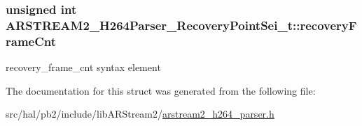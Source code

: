 \subsubsection[{\texorpdfstring{recovery\+Frame\+Cnt}{recoveryFrameCnt}}]{\setlength{\rightskip}{0pt plus 5cm}unsigned int A\+R\+S\+T\+R\+E\+A\+M2\+\_\+\+H264\+Parser\+\_\+\+Recovery\+Point\+Sei\+\_\+t\+::recovery\+Frame\+Cnt}\hypertarget{struct_a_r_s_t_r_e_a_m2___h264_parser___recovery_point_sei__t_a271a4c6349624c0a66b60b419ad2703e}{}\label{struct_a_r_s_t_r_e_a_m2___h264_parser___recovery_point_sei__t_a271a4c6349624c0a66b60b419ad2703e}
recovery\+\_\+frame\+\_\+cnt syntax element 

The documentation for this struct was generated from the following file\+:\begin{DoxyCompactItemize}
\item 
src/hal/pb2/include/lib\+A\+R\+Stream2/\hyperlink{arstream2__h264__parser_8h}{arstream2\+\_\+h264\+\_\+parser.\+h}\end{DoxyCompactItemize}
